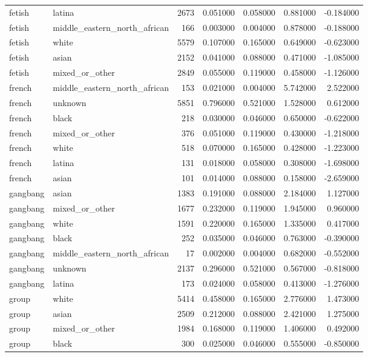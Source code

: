 \begin{tabular}{llrrrrr}
fetish & latina & 2673 & 0.051000 & 0.058000 & 0.881000 & -0.184000 \\
fetish & middle_eastern_north_african & 166 & 0.003000 & 0.004000 & 0.878000 & -0.188000 \\
fetish & white & 5579 & 0.107000 & 0.165000 & 0.649000 & -0.623000 \\
fetish & asian & 2152 & 0.041000 & 0.088000 & 0.471000 & -1.085000 \\
fetish & mixed_or_other & 2849 & 0.055000 & 0.119000 & 0.458000 & -1.126000 \\
french & middle_eastern_north_african & 153 & 0.021000 & 0.004000 & 5.742000 & 2.522000 \\
french & unknown & 5851 & 0.796000 & 0.521000 & 1.528000 & 0.612000 \\
french & black & 218 & 0.030000 & 0.046000 & 0.650000 & -0.622000 \\
french & mixed_or_other & 376 & 0.051000 & 0.119000 & 0.430000 & -1.218000 \\
french & white & 518 & 0.070000 & 0.165000 & 0.428000 & -1.223000 \\
french & latina & 131 & 0.018000 & 0.058000 & 0.308000 & -1.698000 \\
french & asian & 101 & 0.014000 & 0.088000 & 0.158000 & -2.659000 \\
gangbang & asian & 1383 & 0.191000 & 0.088000 & 2.184000 & 1.127000 \\
gangbang & mixed_or_other & 1677 & 0.232000 & 0.119000 & 1.945000 & 0.960000 \\
gangbang & white & 1591 & 0.220000 & 0.165000 & 1.335000 & 0.417000 \\
gangbang & black & 252 & 0.035000 & 0.046000 & 0.763000 & -0.390000 \\
gangbang & middle_eastern_north_african & 17 & 0.002000 & 0.004000 & 0.682000 & -0.552000 \\
gangbang & unknown & 2137 & 0.296000 & 0.521000 & 0.567000 & -0.818000 \\
gangbang & latina & 173 & 0.024000 & 0.058000 & 0.413000 & -1.276000 \\
group & white & 5414 & 0.458000 & 0.165000 & 2.776000 & 1.473000 \\
group & asian & 2509 & 0.212000 & 0.088000 & 2.421000 & 1.275000 \\
group & mixed_or_other & 1984 & 0.168000 & 0.119000 & 1.406000 & 0.492000 \\
group & black & 300 & 0.025000 & 0.046000 & 0.555000 & -0.850000 \\

\end{tabular}

